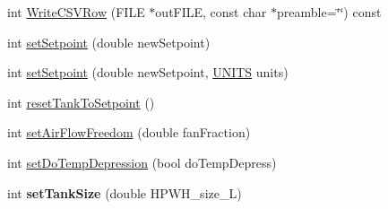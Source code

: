 \begin{DoxyCompactItemize}
\item 
int \hyperlink{class_h_p_w_h_a5652291d663296decd912fe92fb9d4e7}{Write\-C\-S\-V\-Row} (F\-I\-L\-E $\ast$out\-F\-I\-L\-E, const char $\ast$preamble=\char`\"{}\char`\"{}) const 
\item 
int \hyperlink{class_h_p_w_h_adb49b5846f9056602de57cb289e0a321}{set\-Setpoint} (double new\-Setpoint)
\item 
int \hyperlink{class_h_p_w_h_ab7d91fead271ef907cf13450055cdb06}{set\-Setpoint} (double new\-Setpoint, \hyperlink{class_h_p_w_h_a145320dbf116b9245ac4421026cff294}{U\-N\-I\-T\-S} units)
\item 
int \hyperlink{class_h_p_w_h_aac5af7347053c06dcbc446b44fa3686d}{reset\-Tank\-To\-Setpoint} ()
\item 
int \hyperlink{class_h_p_w_h_ae9c7561968c17d6b0bb28d17cc7b700f}{set\-Air\-Flow\-Freedom} (double fan\-Fraction)
\item 
int \hyperlink{class_h_p_w_h_a4fcbecc80f393cabf73609ef97c3e56b}{set\-Do\-Temp\-Depression} (bool do\-Temp\-Depress)
\item 
\hypertarget{class_h_p_w_h_acc2635e0073fee9bdf050eaec8e73d9c}{int {\bfseries set\-Tank\-Size} (double H\-P\-W\-H\-\_\-size\-\_\-\-L)}\label{class_h_p_w_h_acc2635e0073fee9bdf050eaec8e73d9c}


\end{DoxyCompactItemize}
